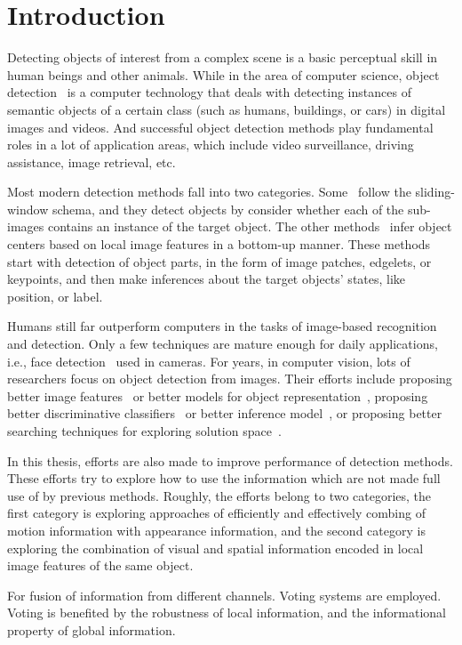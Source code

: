 \chapter{Introduction}
Detecting objects of interest from a complex scene is a basic perceptual skill in human beings and other animals.
While in the area of computer science, object detection~\citep{dod} is a computer technology that deals with detecting instances of semantic objects of a certain class (such as humans, buildings, or cars) in digital images and videos. And successful object detection
methods play fundamental roles in a lot of application areas, which include video surveillance, driving assistance, image retrieval, etc.

Most modern detection methods fall into two categories. Some~\citep{ij4,ac31,ac30,ac4,ac32,ac29,ac28,ac1} follow the sliding-window schema, and they detect objects by consider whether each of the sub-images contains an instance of the target object. The other methods~\citep{ac9,ac2,ac3,ac22,lb1,ac5,ac10,ac21,ac18} infer object centers based on local image features in a bottom-up manner. These methods start with detection of object parts, in the form of image patches, edgelets, or keypoints, and then make inferences about the target objects' states, like position, or label.


 Humans still far outperform computers in the tasks of image-based recognition and detection. Only a few techniques are mature enough for daily applications, i.e., face detection~\citep{face} used in cameras. For years, in computer vision, lots of researchers focus on object detection from images. Their efforts include proposing better image features~\citep{o17} or better models for object representation~\citep{bgf}, proposing better discriminative classifiers~\citep{dlearn} or better inference model~\citep{hdp}, or proposing better searching techniques for exploring solution space~\citep{bab}.

 In this thesis, efforts are also made to improve performance of detection methods. These efforts try to explore how to use the information which are not made full use of by previous methods. Roughly, the efforts belong to two categories, the first category is exploring approaches of efficiently and effectively combing of motion information with appearance information, and the second category is exploring the combination of visual and spatial information encoded in local image features of the same object.

For fusion of information from different channels. Voting systems are employed. Voting is benefited by the robustness of local information, and the informational property of global information.

